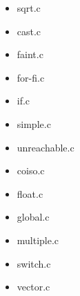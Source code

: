 \begin{itemize}
   \item sqrt.c
   
   {\tiny }
   
   \item cast.c
   
   {\tiny }
   
   \item faint.c
   
   {\tiny }
   
   \item for-fi.c
   
   {\tiny }
   
   \item if.c
   
   {\tiny }
   
   \item simple.c
   
   {\tiny }
   
   \item unreachable.c
   
   {\tiny }
   
   \item coiso.c
   
   {\tiny }
   
   \item float.c
   
   {\tiny }
   
   \item global.c
   
   {\tiny }
   
   \item multiple.c
   
   {\tiny }
   
   \item switch.c
   
   {\tiny }
   
   \item vector.c
   
   {\tiny }
\end{itemize}
